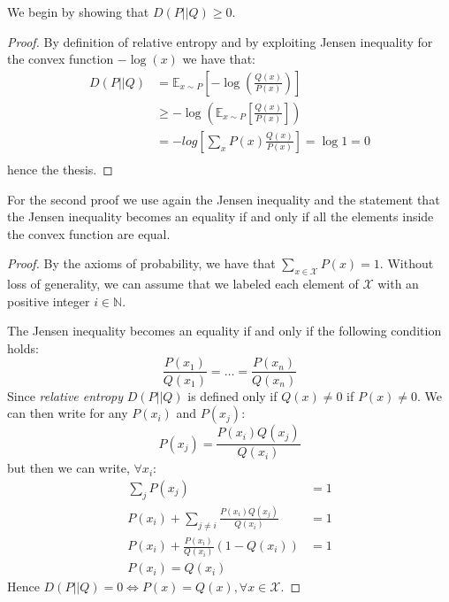 \documentclass[a4paper,10pt]{article}
\begin{document}
\begin{solution}
  We begin by showing that $D(P||Q) \geq 0$.

  \begin{proof}
    By definition of relative entropy and by exploiting Jensen inequality
    for the convex function $-\log(x)$ we have that:
    \begin{equation}
      \label{eq:2}
      \begin{split}
        D(P||Q) &= \mathbb{E}_{x \sim P}\left[-\log(\frac{Q(x)}{P(x)})\right] \\
        & \geq -\log\left(\mathbb{E}_{x \sim
            P}\left[\frac{Q(x)}{P(x)}\right]\right) \\
        &= -log\left[\sum_{x}P(x) \frac{Q(x)}{P(x)}\right] = \log 1 = 0\\
      \end{split}
    \end{equation}
    hence the thesis.
  \end{proof}
  For the second proof we use again the Jensen inequality and the statement
  that the Jensen inequality becomes an equality if and only if all the elements
  inside the convex function are equal.
  \begin{proof}
    By the axioms of probability, we
    have that $\sum_{x \in \mathcal{X}} P(x) = 1$.
    Without loss of generality, we can assume that we labeled each element of
    $\mathcal{X}$ with an positive integer $i \in \mathbb{N}$.

    The Jensen inequality becomes an equality if and only if the following condition holds:
    \begin{equation}
      \label{eq:3}
      \frac{P(x_{1})}{Q(x_{1})} = \dots = \frac{P(x_{n})}{Q(x_{n})}
    \end{equation}
    Since \textit{relative entropy} $D(P||Q)$ is defined only if $Q(x) \ne 0$ if $P(x) \ne 0$. We can
    then write for any $P(x_{i})$ and $P(x_{j})$:
    \begin{equation}
      \label{eq:4}
      P(x_{j}) = \frac{P(x_{i})Q(x_j)}{Q(x_i)}
    \end{equation}
    but then we can write, $\forall x_{i}$:
    \begin{equation}
      \label{eq:5}
      \begin{split}
        \sum_{j}P(x_{j}) &= 1 \\
        P(x_{i}) + \sum_{j \ne i}\frac{P(x_{i})Q(x_{j})}{Q(x_{i})} &= 1\\
        P(x_{i}) + \frac{P(x_{i})}{Q(x_{i})}(1 - Q(x_{i})) &= 1 \\
        P(x_{i}) = Q(x_{i})
      \end{split}
    \end{equation}
    Hence $D(P||Q) = 0 \iff P(x) = Q(x), \forall x \in \mathcal{X}$.
  \end{proof}
\end{solution}
\end{document}
